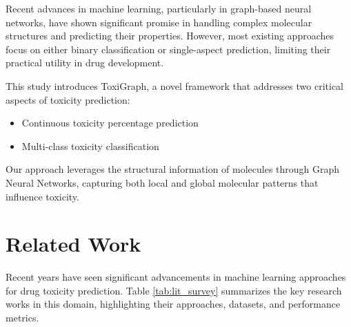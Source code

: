 \documentclass[conference]{IEEEtran}
\begin{document}
Recent advances in machine learning, particularly in graph-based neural networks, have shown significant promise in handling complex molecular structures and predicting their properties. However, most existing approaches focus on either binary classification or single-aspect prediction, limiting their practical utility in drug development.

This study introduces ToxiGraph, a novel framework that addresses two critical aspects of toxicity prediction:
\begin{itemize}
    \item Continuous toxicity percentage prediction
    \item Multi-class toxicity classification
\end{itemize}

Our approach leverages the structural information of molecules through Graph Neural Networks, capturing both local and global molecular patterns that influence toxicity.

\section{Related Work}
Recent years have seen significant advancements in machine learning approaches for drug toxicity prediction. Table \ref{tab:lit_survey} summarizes the key research works in this domain, highlighting their approaches, datasets, and performance metrics.
\end{document}
